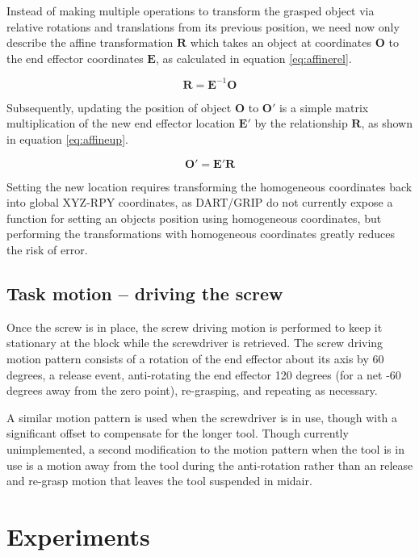\documentclass[10pt, conference]{IEEEtran}
\begin{document}
   Instead of making multiple operations to transform the grasped object
   via relative rotations and translations from its previous position,
   we need now only describe the affine transformation \(\mathbf{R}\)
   which takes an object at coordinates \(\mathbf{O}\) to the end
   effector coordinates \(\mathbf{E}\), as calculated in equation
   \ref{eq:affinerel}.

   \begin{equation}\label{eq:affinerel}
   \mathbf{R} = \mathbf{E}^{-1}\mathbf{O}
   \end{equation}

   Subsequently, updating the position of object \(\mathbf{O}\) to
   \(\mathbf{O'}\) is a simple matrix multiplication of the new end
   effector location \(\mathbf{E'}\) by the relationship \(\mathbf{R}\),
   as shown in equation \ref{eq:affineup}.

   \begin{equation}\label{eq:affineup}
   \mathbf{O'} = \mathbf{E'}\mathbf{R}
   \end{equation}

   Setting the new location requires transforming the homogeneous
   coordinates back into global XYZ-RPY coordinates, as DART/GRIP do not
   currently expose a function for setting an objects position using
   homogeneous coordinates, but performing the transformations with
   homogeneous coordinates greatly reduces the risk of error.
\subsection{Task motion -- driving the screw}
\label{sec-3-6}

   Once the screw is in place, the screw driving motion is performed to
   keep it stationary at the block while the screwdriver is
   retrieved. The screw driving motion pattern consists of a rotation of
   the end effector about its axis by 60 degrees, a release event,
   anti-rotating the end effector 120 degrees (for a net -60 degrees
   away from the zero point), re-grasping, and repeating as necessary.

   A similar motion pattern is used when the screwdriver is in use,
   though with a significant offset to compensate for the longer
   tool. Though currently unimplemented, a second modification to the
   motion pattern when the tool is in use is a motion away from the tool
   during the anti-rotation rather than an release and re-grasp motion
   that leaves the tool suspended in midair.
\section{Experiments}
\label{sec-4}
\end{document}
